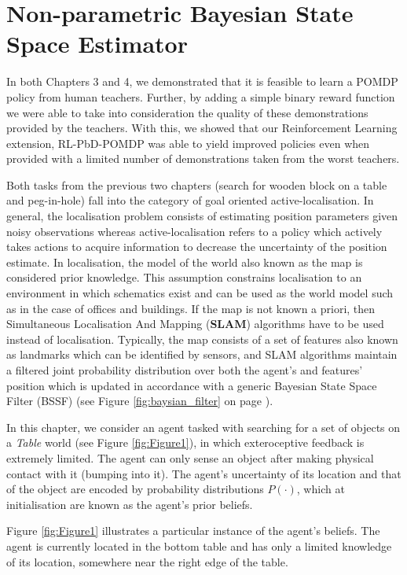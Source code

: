 \chapter{Non-parametric Bayesian State Space Estimator}

In both Chapters 3 and 4, we demonstrated that it is feasible to learn a POMDP policy from human teachers. Further,
by adding a simple binary reward function we were able to take into consideration the quality of these demonstrations 
provided by the teachers. With this, we showed that our Reinforcement Learning extension, RL-PbD-POMDP was able to 
yield improved policies even when provided with a limited number of demonstrations taken from the worst teachers.

Both tasks from the previous two chapters (search for wooden block on a table and peg-in-hole) fall into 
the category of goal oriented active-localisation. In general, the localisation problem consists of estimating 
position parameters given noisy observations whereas active-localisation refers to a policy which actively takes actions to 
acquire information to decrease the uncertainty of the position estimate. In localisation, the model 
of the world also known as the map is considered prior knowledge. This assumption constrains localisation 
to an environment in which schematics exist and can be used 
as the world model such as in the case of offices and buildings. If the map is not known a priori, then Simultaneous Localisation And Mapping (\textbf{SLAM}) algorithms have to be used instead
of localisation. Typically, the map consists of a set of features also known as landmarks which can be identified by sensors, 
and SLAM algorithms maintain a filtered joint probability distribution over both the agent's and features' position which is updated in accordance with a generic 
Bayesian State Space Filter (BSSF) (see Figure \ref{fig:baysian_filter} on page \pageref{fig:baysian_filter}).

In this chapter, we consider an agent tasked with searching for a set of objects on a \textit{Table} world (see Figure \ref{fig:Figure1}), 
in which exteroceptive feedback is extremely limited. The agent can only sense an object after making physical 
contact with it (bumping into it). The agent's uncertainty of its location and that of the object are encoded by probability distributions $P(\cdot)$, which 
at initialisation are known as the agent's prior beliefs.

Figure \ref{fig:Figure1} illustrates a particular instance of the agent's beliefs. The agent is currently located in the 
bottom  table and has only a limited knowledge of its location, somewhere near the right edge of the table. 


